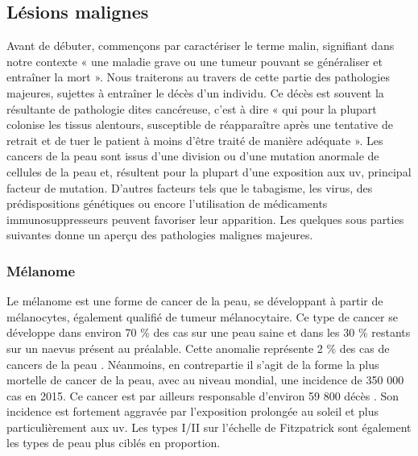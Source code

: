 \subsection{Lésions malignes}
Avant de débuter, commençons par caractériser le terme malin, signifiant dans notre contexte « une maladie grave ou une tumeur pouvant se généraliser et entraîner la mort ». Nous traiterons au travers de cette partie des pathologies majeures, sujettes à entraîner le décès d’un individu. Ce décès est souvent la résultante de pathologie dites cancéreuse, c'est à dire « qui pour la plupart colonise les tissus alentours, susceptible de réapparaître après une tentative de retrait et de tuer le patient à moins d’être traité de manière adéquate ». Les cancers de la peau sont issus d’une division ou d’une mutation anormale de cellules de la peau et, résultent pour la plupart d’une exposition aux \gls{uv}, principal facteur de mutation. D’autres facteurs tels que le tabagisme, les virus, des prédispositions génétiques ou encore l’utilisation de médicaments immunosuppresseurs peuvent favoriser leur apparition. Les quelques sous parties suivantes donne un aperçu des pathologies malignes majeures.\par

\subsubsection{Mélanome}
Le mélanome est une forme de cancer de la peau, se développant à partir de mélanocytes, également qualifié de tumeur mélanocytaire. Ce type de cancer se développe dans environ 70 \% des cas sur une peau saine et dans les 30 \% restants sur un naevus présent au préalable. Cette anomalie représente 2 \% des cas de cancers de la peau \cite{TortoraG;Derrickson2012}. Néanmoins, en contrepartie il s’agit de la forme la plus mortelle de cancer de la peau, avec au niveau mondial, une incidence de 350 000 cas en 2015. Ce cancer est par ailleurs responsable d’environ 59 800 décès \cite{Karimkhani2017}. Son incidence est fortement aggravée par l’exposition prolongée au soleil et plus particulièrement aux \gls{uv}. Les types I/II sur l’échelle de Fitzpatrick sont également les types de peau plus ciblés en proportion.\par

